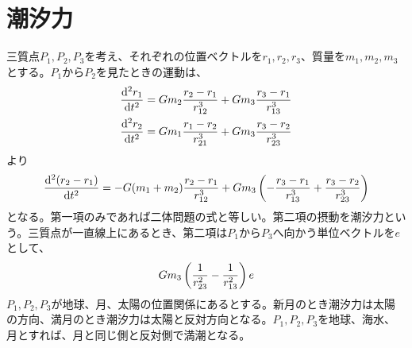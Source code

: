 \section{潮汐力}
    三質点$P_1,P_2,P_3$を考え、それぞれの位置ベクトルを$r_1,r_2,r_3$、質量を$m_1,m_2,m_3$とする。$P_1$から$P_2$を見たときの運動は、
    \begin{gather*}
        \de[^2r_1]{t^2} = Gm_2\frac{r_2 - r_1}{r_{12}^3} + Gm_3\frac{r_3 - r_1}{r_{13}^3}\\
        \de[^2r_2]{t^2} = Gm_1\frac{r_1 - r_2}{r_{21}^3} + Gm_3\frac{r_3 - r_2}{r_{23}^3}\\
    \end{gather*}
    より
        \[\de[^2(r_2 - r_1)]{t^2} = - G(m_1 + m_2)\frac{r_2 - r_1}{r_{12}^3} + Gm_3\lr{ - \frac{r_3 - r_1}{r_{13}^3} + \frac{r_3 - r_2}{r_{23}^3} }\]
    となる。第一項のみであれば二体問題の式と等しい。第二項の摂動を潮汐力という。三質点が一直線上にあるとき、第二項は$P_1$から$P_3$へ向かう単位ベクトルを$e$として、
        \[Gm_3\lr{ \frac{1}{r_{23}^2} - \frac{1}{r_{13}^2} }e\]
    $P_1,P_2,P_3$が地球、月、太陽の位置関係にあるとする。新月のとき潮汐力は太陽の方向、満月のとき潮汐力は太陽と反対方向となる。$P_1,P_2,P_3$を地球、海水、月とすれば、月と同じ側と反対側で満潮となる。

